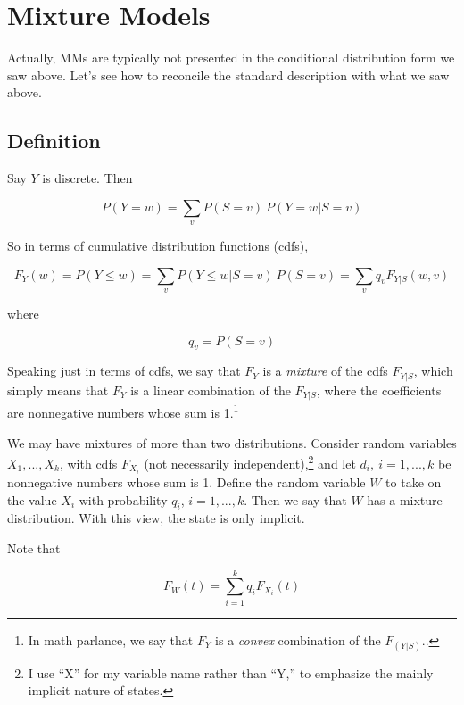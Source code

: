 \documentclass[11pt]{article}
\begin{document}
\section{Mixture Models}

Actually, MMs are typically not presented in the conditional distribution
form we saw above.  Let's see how to reconcile the standard description
with what we saw above.

\subsection{Definition}
\label{mixdef}

Say $Y$ is discrete.  Then

\begin{equation}
P(Y = w) = \sum_{v} P(S = v) ~ P(Y = w | S = v)
\end{equation}

So in terms of cumulative distribution functions (cdfs),

\begin{equation}
\label{mixedFs}
F_Y(w) = P(Y \leq w) = 
\sum_{v} P(Y \leq w | S = v) ~ P(S = v) =
\sum_{v} q_v F_{Y|S}(w,v)
\end{equation}

where 

\begin{equation}
q_v = P(S = v)
\end{equation}

Speaking just in terms of cdfs, we say that $F_Y$ is a \textit{mixture}
of the cdfs $F_{Y|S}$, which simply means that $F_Y$ is a linear
combination of the $F_{Y|S}$, where the coefficients are nonnegative
numbers whose sum is 1.\footnote{In math parlance, we say that $F_Y$ is
a \textit{convex} combination of the $F_{(Y|S)}$..}

We may have mixtures of more than two distributions.  Consider random
variables $X_1,...,X_k$, with cdfs $F_{X_i}$ (not necessarily
independent),\footnote{I use ``X'' for my variable name rather than
``Y,'' to emphasize the mainly implicit nature of states.} and let $d_i,
~ i=1,...,k$ be nonnegative numbers whose sum is 1.  Define the random
variable $W$ to take on the value $X_i$ with probability $q_i$,
$i=1,...,k$.  Then we say that $W$ has a mixture distribution.  With
this view, the state is only implicit.

Note that

\begin{equation}
F_{W}(t) = \sum_{i=1}^k q_i F_{X_i}(t)
\end{equation}
\end{document}
